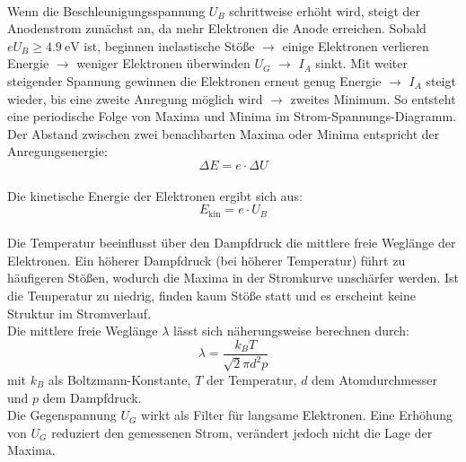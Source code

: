 \vspace{0.3cm}\\
Wenn die Beschleunigungsspannung $U_B$ schrittweise erhöht wird, steigt der Anodenstrom zunächst an, da mehr Elektronen die Anode erreichen. Sobald $e U_B \geq \SI{4.9}{\electronvolt}$ ist, beginnen inelastische Stöße $\rightarrow$ einige Elektronen verlieren Energie $\rightarrow$ weniger Elektronen überwinden $U_G$ $\rightarrow$ $I_A$ sinkt. Mit weiter steigender Spannung gewinnen die Elektronen erneut genug Energie $\rightarrow$ $I_A$ steigt wieder, bis eine zweite Anregung möglich wird $\rightarrow$ zweites Minimum. So entsteht eine periodische Folge von Maxima und Minima im Strom-Spannungs-Diagramm.
\vspace{0.3cm}\\
Der Abstand zwischen zwei benachbarten Maxima oder Minima entspricht der Anregungsenergie:
\begin{equation}
\Delta E = e \cdot \Delta U
\end{equation}
\vspace{0.3cm}\\
Die kinetische Energie der Elektronen ergibt sich aus:
\begin{equation}
E_{\text{kin}} = e \cdot U_B
\end{equation}
\vspace{0.3cm}\\
Die Temperatur beeinflusst über den Dampfdruck die mittlere freie Weglänge der Elektronen. Ein höherer Dampfdruck (bei höherer Temperatur) führt zu häufigeren Stößen, wodurch die Maxima in der Stromkurve unschärfer werden. Ist die Temperatur zu niedrig, finden kaum Stöße statt und es erscheint keine Struktur im Stromverlauf.
\vspace{0.3cm}\\
Die mittlere freie Weglänge $\lambda$ lässt sich näherungsweise berechnen durch:
\begin{equation}
\lambda = \frac{k_B T}{\sqrt{2} \pi d^2 p}
\end{equation}
mit $k_B$ als Boltzmann-Konstante, $T$ der Temperatur, $d$ dem Atomdurchmesser und $p$ dem Dampfdruck.
\vspace{0.3cm}\\
Die Gegenspannung $U_G$ wirkt als Filter für langsame Elektronen. Eine Erhöhung von $U_G$ reduziert den gemessenen Strom, verändert jedoch nicht die Lage der Maxima.
\vspace{0.3cm}\\
